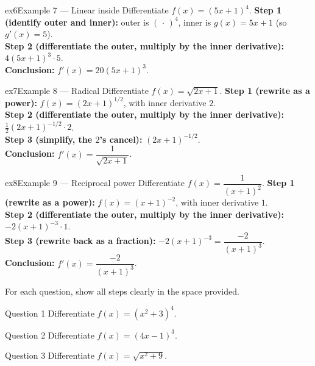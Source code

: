 \documentclass[11pt]{article}
\begin{document}
\begin{example}{ex6}{Example 7 --- Linear inside}
Differentiate $f(x)=(5x+1)^4$.\soln
\textbf{Step 1 (identify outer and inner):} outer is $(\,\cdot\,)^4$, inner is $g(x)=5x+1$ (so $g'(x)=5$).\\[3pt]
\textbf{Step 2 (differentiate the outer, multiply by the inner derivative):} $4(5x+1)^3\cdot5$.\\[3pt]
\textbf{Conclusion:} $f'(x)=20(5x+1)^3$.
\end{example}

\begin{example}{ex7}{Example 8 --- Radical}
Differentiate $f(x)=\sqrt{2x+1}$.\soln
\textbf{Step 1 (rewrite as a power):} $f(x)=(2x+1)^{1/2}$, with inner derivative $2$.\\[3pt]
\textbf{Step 2 (differentiate the outer, multiply by the inner derivative):} $\tfrac12(2x+1)^{-1/2}\cdot2$.\\[3pt]
\textbf{Step 3 (simplify, the $2$'s cancel):} $(2x+1)^{-1/2}$.\\[3pt]
\textbf{Conclusion:} $f'(x)=\dfrac1{\sqrt{2x+1}}$.
\end{example}

\begin{example}{ex8}{Example 9 --- Reciprocal power}
Differentiate $f(x)=\dfrac1{(x+1)^2}$.\soln
\textbf{Step 1 (rewrite as a power):} $f(x)=(x+1)^{-2}$, with inner derivative $1$.\\[3pt]
\textbf{Step 2 (differentiate the outer, multiply by the inner derivative):} $-2(x+1)^{-3}\cdot1$.\\[3pt]
\textbf{Step 3 (rewrite back as a fraction):} $-2(x+1)^{-3}=\dfrac{-2}{(x+1)^3}$.\\[3pt]
\textbf{Conclusion:} $f'(x)=\dfrac{-2}{(x+1)^3}$.
\end{example}

\clearpage
{}
For each question, show all steps clearly in the space provided.

\begin{qbox}{Question 1}
Differentiate $f(x)=(x^2+3)^4$.\workspace{2.4cm}
\end{qbox}

\begin{qbox}{Question 2}
Differentiate $f(x)=(4x-1)^3$.\workspace{2.4cm}
\end{qbox}

\begin{qbox}{Question 3}
Differentiate $f(x)=\sqrt{x^2+9}$.\workspace{2.4cm}
\end{qbox}
\end{document}
